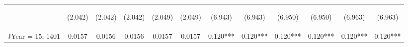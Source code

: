 \documentclass[]{article}
\begin{document}
\begin{center}
\begin{tabular}{lccccccccccc}
        \vspace{4pt}     & \begin{footnotesize}(2.042)\end{footnotesize}  & \begin{footnotesize}(2.042)\end{footnotesize}  & \begin{footnotesize}(2.042)\end{footnotesize}  & \begin{footnotesize}(2.049)\end{footnotesize}  & \begin{footnotesize}(2.049)\end{footnotesize}  & \begin{footnotesize}(6.943)\end{footnotesize}   & \begin{footnotesize}(6.943)\end{footnotesize}   & \begin{footnotesize}(6.950)\end{footnotesize}  & \begin{footnotesize}(6.950)\end{footnotesize}  & \begin{footnotesize}(6.963)\end{footnotesize}  & \begin{footnotesize}(6.963)\end{footnotesize}  \\
        JYear = 15, 1401 & 0.0157                                         & 0.0156                                         & 0.0156                                         & 0.0157                                         & 0.0157                                         & 0.120***                                        & 0.120***                                        & 0.120***                                       & 0.120***                                       & 0.120***                                       & 0.120***                                       \\

\end{tabular}
\end{center}
\end{document}
